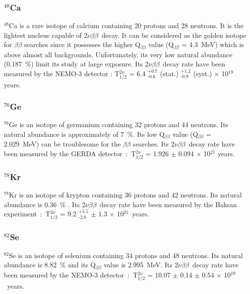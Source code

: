 \documentclass[main.tex]{subfiles}
\begin{document}
\subsubsection{$^{\text{48}}$Ca}


\NI $^\text{48}$Ca is a rare isotope of calcium containing 20 protons and 28 neutrons. It is the lightest nucleus capable of 2$\nu\beta\beta$~decay. It can be considered as the golden isotope for $\beta\beta$ searches since it possesses the higher Q$_{\beta\beta}$ value (Q$_{\beta\beta}$ = 4.3~MeV) which is above almost all backgrounds. Unfortunately, its very low natural abundance (0.187~\%) limit its study at large exposure. Its 2$\nu\beta\beta$~decay rate have been measured by the NEMO-3 detector : T$_{\text{1/2}}^{\text{2}\nu}$ = 6.4 $^{\text{+0.7}}_{\text{-0.6}}$ (stat.) $^{\text{+1.2}}_{\text{-0.9}}$ (syst.) $\times$ 10$^{\text{19}}$ years. 

 
\subsubsection{$^{\text{76}}$Ge}


\NI $^\text{76}$Ge is an isotope of germanium containing 32 protons and 44 neutrons. Its natural abundance is approximately of 7~\%. Its low Q$_{\beta\beta}$ value (Q$_{\beta\beta}$ = 2.029~MeV) can be troublesome for the $\beta\beta$ searches. Its 2$\nu\beta\beta$~decay rate have been measured by the GERDA detector~:~T$_{\text{1/2}}^{\text{2}\nu}$ = 1.926 $\pm$ 0.094 $\times$ 10$^{\text{21}}$ years.   


\subsubsection{$^{\text{78}}$Kr}


\NI $^\text{78}$Kr is an isotope of krypton containing 36 protons and 42 neutrons. Its natural abundance is 0.36~\% . Its 2$\nu\beta\beta$~decay rate have been measured by the Baksan experiment~:~T$_{\text{1/2}}^{\text{2}\nu}$ = 9.2 $^{\text{+5.5}}_{\text{-2.6}}$ $\pm$ 1.3 $\times$ 10$^{\text{21}}$~years.   


\subsubsection{$^{\text{82}}$Se}


\NI $^\text{82}$Se is an isotope of selenium containing 34 protons and 48 neutrons. Its natural abundance is 8.82~\% and its Q$_{\beta\beta}$ value is 2.995~MeV. Its 2$\nu\beta\beta$~decay rate have been measured by the NEMO-3 detector~:~T$_{\text{1/2}}^{\text{2}\nu}$ = 10.07 $\pm$ 0.14 $\pm$ 0.54 $\times$ 10$^{\text{19}}$~years. 
\end{document}
